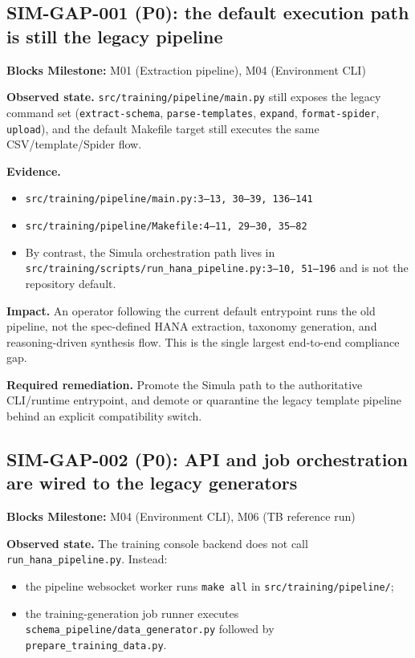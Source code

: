 \subsection*{SIM-GAP-001 (P0): the default execution path is still the legacy pipeline}
\label{gap:sim-001}
\textbf{Blocks Milestone:} M01 (Extraction pipeline), M04 (Environment CLI)

\textbf{Observed state.}
\texttt{src/training/pipeline/main.py} still exposes the
legacy command set
(\texttt{extract-schema}, \texttt{parse-templates},
\texttt{expand}, \texttt{format-spider}, \texttt{upload}),
and the default Makefile target still executes the same
CSV/template/Spider flow.

\textbf{Evidence.}
\begin{itemize}
  \item \texttt{src/training/pipeline/main.py:3--13, 30--39,
    136--141}
  \item \texttt{src/training/pipeline/Makefile:4--11, 29--30,
    35--82}
  \item By contrast, the Simula orchestration path lives in
    \texttt{src/training/scripts/run\_hana\_pipeline.py:3--10,
    51--196} and is not the repository default.
\end{itemize}

\textbf{Impact.}
An operator following the current default entrypoint runs the old
pipeline, not the spec-defined HANA extraction, taxonomy generation,
and reasoning-driven synthesis flow. This is the single largest
end-to-end compliance gap.

\textbf{Required remediation.}
Promote the Simula path to the authoritative CLI/runtime entrypoint,
and demote or quarantine the legacy template pipeline behind an
explicit compatibility switch.

\subsection*{SIM-GAP-002 (P0): API and job orchestration are wired to the legacy generators}
\label{gap:sim-002}
\textbf{Blocks Milestone:} M04 (Environment CLI), M06 (TB reference run)

\textbf{Observed state.}
The training console backend does not call
\texttt{run\_hana\_pipeline.py}. Instead:
\begin{itemize}
  \item the pipeline websocket worker runs \texttt{make all} in
    \texttt{src/training/pipeline/};
  \item the training-generation job runner executes
    \texttt{schema\_pipeline/data\_generator.py} followed by
    \texttt{prepare\_training\_data.py}.
\end{itemize}

